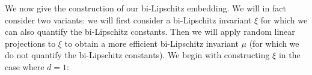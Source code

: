 \documentclass{amsart}
\theoremstyle{plain}
\theoremstyle{definition}
\theoremstyle{remark}
\begin{document}
%
We now give the construction of our bi-Lipschitz embedding. We will in fact consider two variants: we will first consider a bi-Lipschitz invariant $\xi$ for which we can also quantify the bi-Lipschitz constants. Then we will apply random linear projections to $\xi$ to obtain a more efficient bi-Lipschitz invariant $\mu$ (for which we do not quantify the bi-Lipschitz constants). We begin with constructing $\xi$ in the case where $d=1$:
\end{document}

